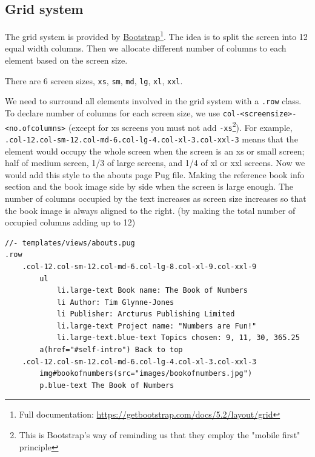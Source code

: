 \subsection{Grid system}
\label{sec:grid}



The grid system is provided by \href{https://getbootstrap.com/docs/5.2/layout/grid}{Bootstrap}\footnote{Full documentation: \url{https://getbootstrap.com/docs/5.2/layout/grid}}. The idea is to split the screen into 12 equal width columns. Then we allocate different number of columns to each element based on the screen size.

There are 6 screen sizes, \texttt{xs}, \texttt{sm}, \texttt{md}, \texttt{lg}, \texttt{xl}, \texttt{xxl}.

We need to surround all elements involved in the grid system with a \texttt{.row} class. To declare number of columns for each screen size, we use \texttt{col-<screensize>-\hfill \break <no.ofcolumns>} (except for xs screens you must not add \texttt{-xs}\footnote{This is Bootstrap's way of reminding us that they employ the "mobile first" principle}). For example, \texttt{.col-12.col-sm-12.col-md-6.col-lg-4.col-xl-3.col-xxl-3} means that the element would occupy the whole screen when the screen is an xs or small screen; half of medium screen, 1/3 of large screens, and 1/4 of xl or xxl screens. Now we would add this style to the abouts page Pug file. Making the reference book info section and the book image side by side when the screen is large enough. The number of columns occupied by the text increases as screen size increases so that the book image is always aligned to the right. (by making the total number of occupied columns adding up to 12)
\vspace{6mm}

\begin{lstlisting}[language=pug]
//- templates/views/abouts.pug
.row
    .col-12.col-sm-12.col-md-6.col-lg-8.col-xl-9.col-xxl-9
        ul
            li.large-text Book name: The Book of Numbers
            li Author: Tim Glynne-Jones
            li Publisher: Arcturus Publishing Limited
            li.large-text Project name: "Numbers are Fun!"
            li.large-text.blue-text Topics chosen: 9, 11, 30, 365.25
        a(href="#self-intro") Back to top
    .col-12.col-sm-12.col-md-6.col-lg-4.col-xl-3.col-xxl-3
        img#bookofnumbers(src="images/bookofnumbers.jpg")
        p.blue-text The Book of Numbers
\end{lstlisting}

